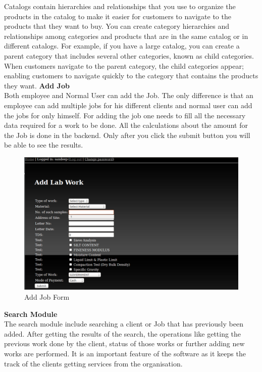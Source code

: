 Catalogs contain hierarchies and relationships that you use to organize the products in the catalog to make it easier for customers to navigate to the products that they want to buy. You can create category hierarchies and relationships among categories and products that are in the same catalog or in different catalogs. For example, if you have a large catalog, you can create a parent category that includes several other categories, known as child categories. When customers navigate to the parent category, the child categories appear; enabling customers to navigate quickly to the category that contains the products they want.
\newpage
{\bf Add Job}\\

Both employee and Normal User can add the Job. The only difference is that an employee can add multiple jobs for his different clients and normal user can add the jobs for only himself. For adding the job one needs to fill all the necessary data required for a work to be done.
All the calculations about the amount for the Job is done in the backend. Only after you click the submit button you will be able to see the results.
\begin{figure}[h]
\vskip 2cm
\centering \includegraphics[scale=1.0]{addjob1.png}
\caption{Add Job Form}
\end{figure}

\newpage
{\bf Search Module}\\

The search module include searching a client or Job that has previously been added. After getting the results of the search, the operations like getting the previous work done by the client, status of those works or further adding new works are performed. It is an important feature of the software as it keeps the track of the clients getting services from the organisation.

